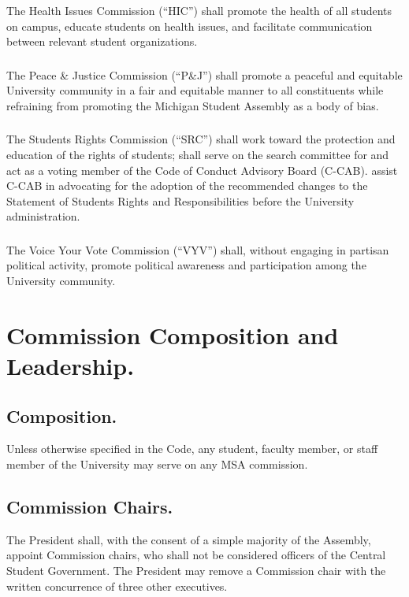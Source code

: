 \subsubsection{}
The Health Issues Commission (``HIC'') shall promote the health of all students on campus, educate students on health issues, and facilitate communication between relevant student organizations.

\subsubsection{}
The Peace \& Justice Commission (``P\&J'') shall promote a peaceful and equitable University community in a fair and equitable manner to all constituents while refraining from promoting the Michigan Student Assembly as a body of bias.

\subsubsection{}
The Students Rights Commission (``SRC'') shall 
\subsubsubsection{}
work toward the protection and education of the rights of students;
\subsubsubsection{}
shall serve on the search committee for and act as a voting member of the Code of Conduct Advisory Board (C-CAB).
\subsubsubsection{}
assist C-CAB in advocating for the adoption of the recommended changes to the Statement of Students Rights and Responsibilities before the University administration.

\subsubsection{}
The Voice Your Vote Commission (``VYV'') shall, without engaging in partisan political activity, promote political awareness and participation among the University community.


\section{Commission Composition and Leadership.}

\subsection{Composition.}
Unless otherwise specified in the Code, any student, faculty member, or staff member of the University may serve on any MSA commission.

\subsection{Commission Chairs.}
The President shall, with the consent of a simple majority of the Assembly, appoint Commission chairs, who shall not be considered officers of the Central Student Government.  The President may remove a
Commission chair with the written concurrence of three other executives.

